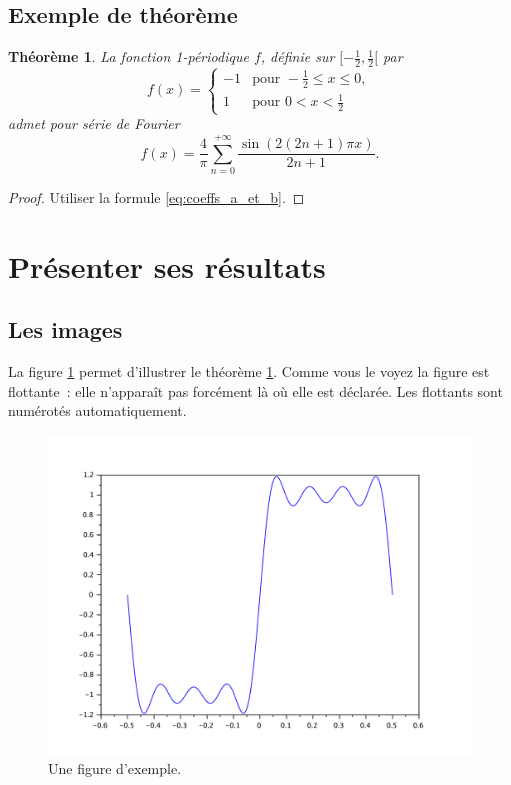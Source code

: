 \documentclass[12pt]{article}
\newtheorem{theorem}{Théorème} %
\begin{document}
\subsection{Exemple de théorème}

\begin{theorem}
\label{th:Fourier}
La fonction 1-périodique $f$, définie sur $[-\frac12, \frac12[$ par
\begin{equation*}
    f(x) = \begin{cases} 
    -1 & \text{pour } -\frac12 \leq x \leq 0, \\
    1 & \text{pour } 0 < x < \frac12
    \end{cases}
\end{equation*}
admet pour série de Fourier
\begin{equation*}
    f(x) = \frac4\pi \sum_{n=0}^{+\infty} \frac{\sin(2(2n+1)\pi x)}{2n+1}.
\end{equation*}
\end{theorem}

\begin{proof}
Utiliser la formule \eqref{eq:coeffs_a_et_b}.
\end{proof}

\section{Présenter ses résultats}

\subsection{Les images}

La figure \ref{fig:exemple} permet d'illustrer le théorème \ref{th:Fourier}. 
Comme vous le voyez la figure est flottante~: elle n'apparaît pas forcément là où elle est déclarée. 
Les flottants sont numérotés automatiquement.
 
\begin{figure}[t]
\centering
\includegraphics[width=.5\textwidth]{sampleimage.pdf}
\caption{\label{fig:exemple}Une figure d'exemple.}
\end{figure}
\end{document}
